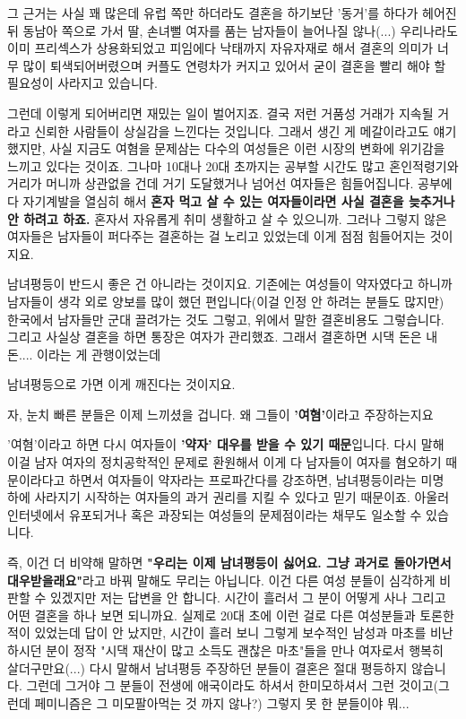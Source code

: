그 근거는 사실 꽤 많은데
유럽 쪽만 하더라도 결혼을 하기보단 '동거'를 하다가 헤어진 뒤 동남아 쪽으로 가서 딸, 손녀뻘 여자를 품는 남자들이 늘어나질 않나(...)
우리나라도 이미 프리섹스가 상용화되었고 피임에다 낙태까지 자유자재로 해서 결혼의 의미가 너무 많이 퇴색되어버렸으며
커플도 연령차가 커지고 있어서 굳이 결혼을 빨리 해야 할 필요성이 사라지고 있습니다.
\vspace{5mm}

그런데 이렇게 되어버리면 재밌는 일이 벌어지죠. 결국 저런 거품성 거래가 지속될 거라고 신뢰한 사람들이 상실감을 느낀다는 것입니다.
그래서 생긴 게 메갈이라고도 얘기했지만, 사실 지금도 여혐을 문제삼는 다수의 여성들은 이런 시장의 변화에 위기감을 느끼고 있다는 것이죠.
그나마 10대나 20대 초까지는 공부할 시간도 많고 혼인적령기와 거리가 머니까 상관없을 건데 거기 도달했거나 넘어선 여자들은 힘들어집니다.
공부에다 자기계발을 열심히 해서 \textbf{혼자 먹고 살 수 있는 여자들이라면 사실 결혼을 늦추거나 안 하려고 하죠.}
혼자서 자유롭게 취미 생활하고 살 수 있으니까.
그러나 그렇지 않은 여자들은 남자들이 퍼다주는 결혼하는 걸 노리고 있었는데 이게 점점 힘들어지는 것이지요.
\vspace{5mm}

남녀평등이 반드시 좋은 건 아니라는 것이지요.
기존에는 여성들이 약자였다고 하니까 남자들이 생각 외로 양보를 많이 했던 편입니다(이걸 인정 안 하려는 분들도 많지만)
한국에서 남자들만 군대 끌려가는 것도 그렇고, 위에서 말한 결혼비용도 그렇습니다.
그리고 사실상 결혼을 하면 통장은 여자가 관리했죠.
그래서 결혼하면 시댁 돈은 내 돈.... 이라는 게 관행이었는데
\vspace{5mm}

남녀평등으로 가면 이게 깨진다는 것이지요.
\vspace{5mm}

자, 눈치 빠른 분들은 이제 느끼셨을 겁니다. 왜 그들이 \textbf{'여혐'}이라고 주장하는지요
\vspace{5mm}

'여혐'이라고 하면 다시 여자들이 \textbf{'약자' 대우를 받을 수 있기 때문}입니다.
다시 말해 이걸 남자 여자의 정치공학적인 문제로 환원해서 이게 다 남자들이 여자를 혐오하기 때문이라다고 하면서
여자들이 약자라는 프로파간다를 강조하면, 남녀평등이라는 미명 하에 사라지기 시작하는 여자들의 과거 권리를 지킬 수 있다고 믿기 때문이죠.
아울러 인터넷에서 유포되거나 혹은 과장되는 여성들의 문제점이라는 채무도 일소할 수 있습니다.
\vspace{5mm}

즉, 이건 더 비약해 말하면 \textbf{"우리는 이제 남녀평등이 싫어요. 그냥 과거로 돌아가면서 대우받을래요"}라고 바꿔 말해도 무리는 아닙니다.
이건 다른 여성 분들이 심각하게 비판할 수 있겠지만 저는 답변을 안 합니다. 시간이 흘러서 그 분이 어떻게 사나 그리고 어떤 결혼을 하나 보면 되니까요.
실제로 20대 초에 이런 걸로 다른 여성분들과 토론한 적이 있었는데 답이 안 났지만, 시간이 흘러 보니
그렇게 보수적인 남성과 마초를 비난하시던 분이 정작 "시댁 재산이 많고 소득도 괜찮은 마초"들을 만나 여자로서 행복히 살더구만요(...)
다시 말해서 남녀평등 주장하던 분들이 결혼은 절대 평등하지 않습니다.
그런데 그거야 그 분들이 전생에 애국이라도 하셔서 한미모하셔서 그런 것이고(그런데 페미니즘은 그 미모팔아먹는 것 까지 않나?)
그렇지 못 한 분들이야 뭐...
\vspace{5mm}

